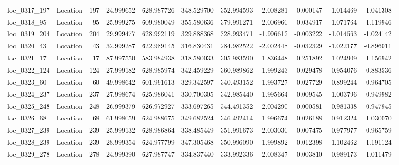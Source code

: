 \begin{tabular}{llrrrrrrrrr}
 loc_0317_197 &        Location &             197 &  24.999652 & 628.987726 &  348.529700 &    352.994593 &  -2.008281 &  -0.000147 &   -1.014469 &     -1.041308 \\
  loc_0318_95 &        Location &              95 &  25.999275 & 609.980049 &  355.580636 &    379.991271 &  -2.006960 &  -0.034917 &   -1.071764 &     -1.119946 \\
 loc_0319_204 &        Location &             204 &  29.999477 & 628.992119 &  329.888368 &    328.993471 &  -1.996612 &  -0.003222 &   -1.014563 &     -1.024142 \\
  loc_0320_43 &        Location &              43 &  32.999287 & 622.989145 &  316.830431 &    284.982522 &  -2.002448 &  -0.032329 &   -1.022177 &     -0.896011 \\
  loc_0321_17 &        Location &              17 &  87.997550 & 583.984938 &  318.580033 &    305.983590 &  -1.836448 &  -0.251892 &   -1.024909 &     -1.156942 \\
 loc_0322_124 &        Location &             124 &  27.999182 & 628.985974 &  342.459229 &    360.989862 &  -1.999243 &  -0.029478 &   -0.954076 &     -0.883536 \\
  loc_0323_60 &        Location &              60 &  49.998642 & 601.991613 &  329.342597 &    340.493152 &  -1.993727 &  -0.027729 &   -0.899244 &     -0.964705 \\
 loc_0324_237 &        Location &             237 &  27.998674 & 625.986041 &  330.700305 &    342.985440 &  -1.995664 &  -0.009545 &   -1.003796 &     -0.949982 \\
 loc_0325_248 &        Location &             248 &  26.999379 & 626.972927 &  333.697265 &    344.491352 &  -2.004290 &  -0.000581 &   -0.981338 &     -0.947945 \\
  loc_0326_68 &        Location &              68 &  61.998059 & 624.988675 &  349.682524 &    346.492414 &  -1.996674 &  -0.026188 &   -0.912324 &     -1.030070 \\
 loc_0327_239 &        Location &             239 &  25.999132 & 628.986864 &  338.485449 &    351.991673 &  -2.003030 &  -0.007475 &   -0.977977 &     -0.965759 \\
 loc_0328_239 &        Location &             239 &  28.999354 & 624.977799 &  347.305468 &    350.996090 &  -1.999892 &  -0.012398 &   -1.102462 &     -1.191124 \\
 loc_0329_278 &        Location &             278 &  24.999390 & 627.987747 &  334.837440 &    333.992336 &  -2.008347 &  -0.003810 &   -0.989173 &     -1.011479 \\

\end{tabular}
